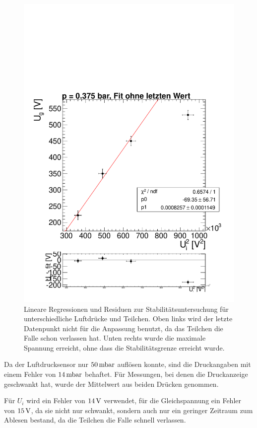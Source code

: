 \documentclass[a4paper,12pt]{article}
\begin{document}
\begin{figure}[htb]
		\includegraphics[height = 0.3\textheight]{linReg375bar.pdf}
		\caption{Lineare Regressionen und Residuen zur Stabilitätsuntersuchung für unterschiedliche Luftdrücke und Teilchen.
			Oben links wird der letzte Datenpunkt nicht für die Anpassung benutzt, da das Teilchen die Falle schon verlassen hat.
			Unten rechts wurde die maximale Spannung erreicht, ohne dass die Stabilitätsgrenze erreicht wurde.
		}
		\label{linReg}
\end{figure}

Da der Luftdrucksensor nur $\unit[50]{mbar}$ auflösen konnte, sind die Druckangaben mit einem Fehler von $\unit[14]{mbar}$ behaftet.
Für Messungen, bei denen die Druckanzeige geschwankt hat, wurde der Mittelwert aus beiden Drücken genommen.


Für $U_i$ wird ein Fehler von $\unit[14]{V}$ verwendet, für die Gleichspannung ein Fehler von $\unit[15]{V}$, da sie nicht nur schwankt, sondern auch nur ein geringer Zeitraum zum Ablesen bestand, 
da die Teilchen die Falle schnell verlassen.
\end{document}
